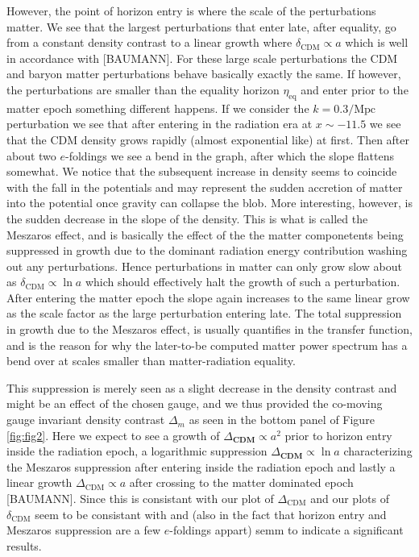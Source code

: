 \documentclass[twocolumn]{aastex62}
\begin{document}
However, the point of horizon entry is where the scale of the perturbations matter. We see that the largest perturbations that enter late, after equality, go from a constant density contrast to a linear growth where $\delta_\mathrm{CDM}\propto a$ which is well in accordance with [BAUMANN]. For these large scale perturbations the CDM and baryon matter perturbations behave basically exactly the same. If however, the perturbations are smaller than the equality horizon $\eta_\text{eq}$ and enter prior to the matter epoch something different happens. If we consider the $k = 0.3 /\mathrm{Mpc}$ perturbation we see that after entering in the radiation era at $x\sim-11.5$ we see that the CDM density grows rapidly (almost exponential like) at first. Then after about two $e$-foldings we see a bend in the graph, after which the slope flattens somewhat. We notice that the subsequent increase in density seems to coincide with the fall in the potentials and may represent the sudden accretion of matter into the potential once gravity can collapse the blob. More interesting, however, is the sudden decrease in the slope of the density. This is what is called the Meszaros effect, and is basically the effect of the the matter componetents being suppressed in growth due to the dominant radiation energy contribution washing out any perturbations. Hence perturbations in matter can only grow slow about as $\delta_\mathrm{CDM}\propto \ln a$ which should effectively halt the growth of such a perturbation. After entering the matter epoch the slope again increases to the same linear grow as the scale factor as the large perturbation entering late. The total suppression in growth due to the Meszaros effect, is usually quantifies in the transfer function, and is the reason for why the later-to-be computed matter power spectrum has a bend over at scales smaller than matter-radiation equality.

This suppression is merely seen as a slight decrease in the density contrast and might be an effect of the chosen gauge, and we thus provided the co-moving gauge invariant density contrast $\Delta_m$ as seen in the bottom panel of Figure \ref{fig:fig2}. Here we expect to see a growth of $\Delta_\textbf{CDM}\propto a^2$ prior to horizon entry inside the radiation epoch, a logarithmic suppression $\Delta_\textbf{CDM} \propto \ln a$ characterizing the Meszaros suppression after entering inside the radiation epoch and lastly a linear growth $\Delta_\text{CDM} \propto a$ after crossing to the matter dominated epoch [BAUMANN]. Since this is consistant with our plot of $\Delta_\text{CDM}$ and our plots of $\delta_\text{CDM}$ seem to be consistant with \cite{dodelson:2003} and \cite{winther:2020b} (also in the fact that horizon entry and Meszaros suppression are a few $e$-foldings appart) semm to indicate a significant results. 
\end{document}
